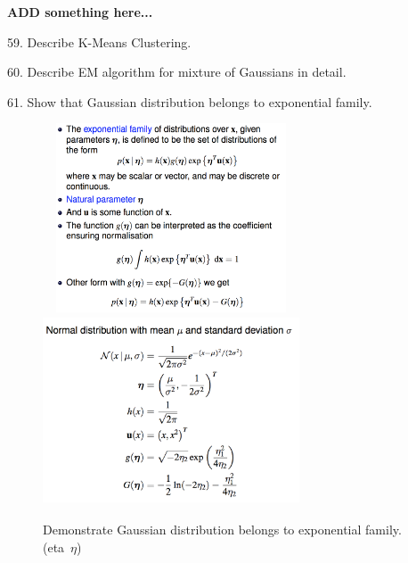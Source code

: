 \documentclass[11pt,a4paper]{article}
\newcommand{\BOLD}[1]{\textbf{#1}}
\begin{document}
    \BOLD{ADD something here...}

    \newpage

59. Describe K-Means Clustering.

60. Describe EM algorithm for mixture of Gaussians in detail.

61. Show that Gaussian distribution belongs to exponential family.

\begin{figure}[H] \centering
    \includegraphics[width=3in,height=2.2in]{./figure/expfamily_1.png}
    \includegraphics[width=3in,height=2.2in]{./figure/expfamily_2.png}
    \caption{Demonstrate Gaussian distribution belongs to exponential family. (eta\ $\eta$)}
\end{figure}
\end{document}
